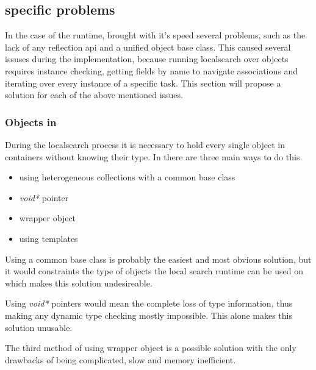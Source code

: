 \subsection{\CPP{} specific problems}\label{sect:CppSpecificProblems}

In the case of the runtime, \CPP{} brought with it's speed several problems, such
as the lack of any reflection api and a unified object base class. This caused
several issuses during the implementation, because running localsearch over \CPP{}
objects requires instance checking, getting fields by name to navigate
associations and iterating over every instance of a specific task. This section
will propose a solution for each of the above mentioned issues.

\subsubsection{Objects in \CPP{}}\label{sect:ObjectsInCpp}

During the localsearch process it is necessary to hold every single object in
containers without knowing their type. In \CPP{} there are three main ways to do
this.

\begin{itemize}
  \item using heterogeneous collections with a common base class
  \item \emph{void*} pointer
  \item wrapper object
  \item using templates
\end{itemize}

Using a common base class is probably the easiest and most obvious solution,
but it would constraints the type of objects the local search runtime can
be used on which makes this solution undesireable.

Using \emph{void*} pointers would mean the complete loss of type information,
thus making any dynamic type checking mostly impossible. This alone makes this
solution unusable.

The third method of using wrapper object is a possible solution with the
only drawbacks of being complicated, slow and memory inefficient.

